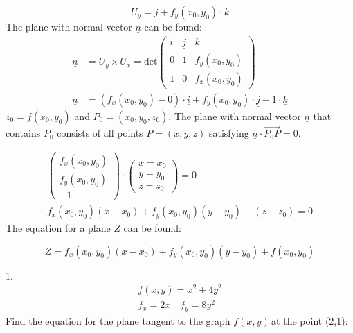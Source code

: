 \documentclass{article}
\newcommand{\n}{\leavevmode \newline} %
\newcommand{\fxy}{$f(x,y)\,$} %
\numberwithin{equation}{subsection} %
\begin{document}
\begin{equation}
    U_y= \underline{j} + f_y(x_0,y_0)\cdot \underline{k}
\end{equation}
\n
The plane with normal vector $\underline{n}$ can be found:
\begin{equation}
    \begin{split}
        \underline{n}&=U_y \times U_x = \text{det}
        \begin{pmatrix}
            \underline{i} & \underline{j} & \underline{k}\\
            0 & 1 & f_y(x_0,y_0)\\
            1 & 0 & f_x(x_0,y_0)
        \end{pmatrix}\\
        \underline{n}&=(f_x(x_0,y_0)-0)\cdot \underline{i} + f_y(x_0,y_0)\cdot \underline{j} - 1\cdot\underline{k}
    \end{split}
\end{equation}
\n
$z_0=f(x_0,y_0)$ and $P_0=(x_0,y_0,z_0)$. The plane with normal vector $\underline{n}$ that contains $P_0$ consists of all points $P=(x,y,z)$ satisfying $\underline{n}\cdot \overrightarrow{P_0P}=0$.

\begin{equation}
    \begin{split}
        \begin{pmatrix}
        f_x(x_0,y_0)\\
        f_y(x_0,y_0)\\
        -1
    \end{pmatrix}
    \cdot
    \begin{pmatrix}
        x=x_0\\
        y=y_0\\
        z=z_0
    \end{pmatrix}
    =0\\
    f_x(x_0,y_0)(x-x_0)+f_y(x_0,y_0)(y-y_0)-(z-z_0)=0
    \end{split}
\end{equation}
\n
The equation for a plane $Z$ can be found:

\begin{equation}
    Z=f_x(x_0,y_0)(x-x_0)+f_y(x_0,y_0)(y-y_0)+f(x_0,y_0)
\end{equation}
\n

1.
\begin{equation}
    \begin{split}
        f(x,y)=x^2+4y^2\\
        f_x=2x \quad f_y=8y^2
    \end{split}
\end{equation}
\n
Find the equation for the plane tangent to the graph \fxy at the point (2,1):
\end{document}

